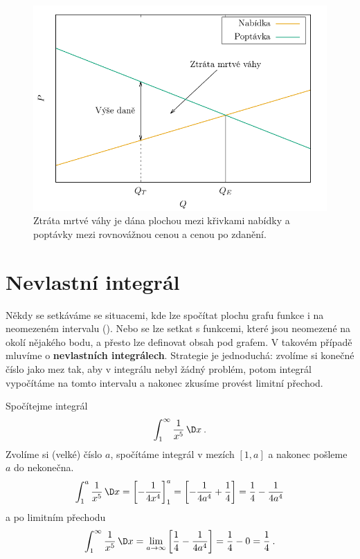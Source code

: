 \begin{figure}[H]
    \centering
    \includegraphics[scale = 0.8]{Gnuplot/Figures/ztrata-mrtve-vahy-graf.pdf}
    \caption{Ztráta mrtvé váhy je dána plochou mezi křivkami nabídky a poptávky mezi rovnovážnou cenou a cenou po zdanění.}
\end{figure}

\section*{Nevlastní integrál}

Někdy se setkáváme se situacemi, kde lze spočítat plochu grafu funkce i na neomezeném intervalu (). Nebo se lze setkat s funkcemi, které jsou neomezené na okolí nějakého bodu, a přesto lze definovat obsah pod grafem. V takovém případě mluvíme o \textbf{nevlastních integrálech}. Strategie je jednoduchá: zvolíme si konečné číslo jako mez tak, aby v integrálu nebyl žádný problém, potom integrál vypočítáme na tomto intervalu a nakonec zkusíme provést limitní přechod.

\begin{example}
    Spočítejme integrál
    \begin{align}
        \int_1^\infty \frac{1}{x^5} \, \D x \:.
    \end{align}
    Zvolíme si (velké) číslo $a$, spočítáme integrál v mezích $[1,a]$ a nakonec pošleme $a$ do nekonečna.
    \begin{align}
        \int_1^a \frac{1}{x^5} \, \D x = \left[ -\frac{1}{4x^4} \right]_1^a
        = \left[ - \frac{1}{4a^4} + \frac{1}{4} \right] = \frac{1}{4} -\frac{1}{4a^4}
    \end{align}
    a po limitním přechodu \begin{align}
        \int_1^\infty \frac{1}{x^5} \, \D x = \lim_{a \rightarrow \infty} \left[ \frac{1}{4} -\frac{1}{4a^4} \right] = \frac{1}{4} - 0 = \frac{1}{4} \:.
    \end{align}
\end{example}

